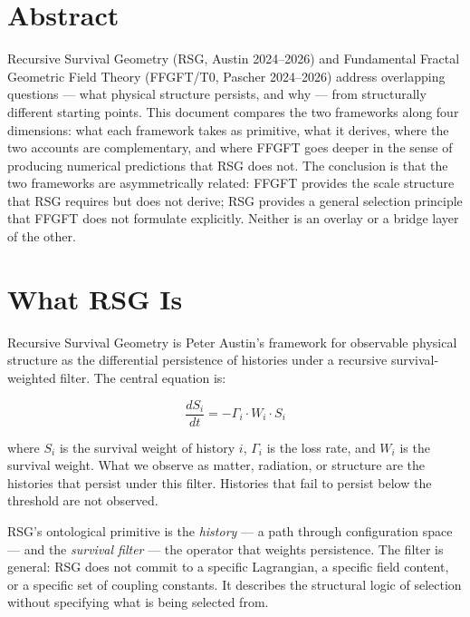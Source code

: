 
\section*{Abstract}

Recursive Survival Geometry (RSG, Austin 2024--2026) and Fundamental Fractal
Geometric Field Theory (FFGFT/T0, Pascher 2024--2026) address overlapping
questions — what physical structure persists, and why — from structurally
different starting points. This document compares the two frameworks along
four dimensions: what each framework takes as primitive, what it derives, where
the two accounts are complementary, and where FFGFT goes deeper in the sense of
producing numerical predictions that RSG does not. The conclusion is that the
two frameworks are asymmetrically related: FFGFT provides the scale structure
that RSG requires but does not derive; RSG provides a general selection
principle that FFGFT does not formulate explicitly. Neither is an overlay or
a bridge layer of the other.

\section{What RSG Is}

Recursive Survival Geometry is Peter Austin's framework for observable
physical structure as the differential persistence of histories under a
recursive survival-weighted filter. The central equation is:

\begin{equation}
  \frac{dS_i}{dt} = -\Gamma_i \cdot W_i \cdot S_i
\end{equation}

where $S_i$ is the survival weight of history $i$, $\Gamma_i$ is the loss
rate, and $W_i$ is the survival weight. What we observe as matter, radiation,
or structure are the histories that persist under this filter. Histories that
fail to persist below the threshold are not observed.

RSG's ontological primitive is the \emph{history} — a path through
configuration space — and the \emph{survival filter} — the operator that
weights persistence. The filter is general: RSG does not commit to a specific
Lagrangian, a specific field content, or a specific set of coupling constants.
It describes the structural logic of selection without specifying what is being
selected from.

